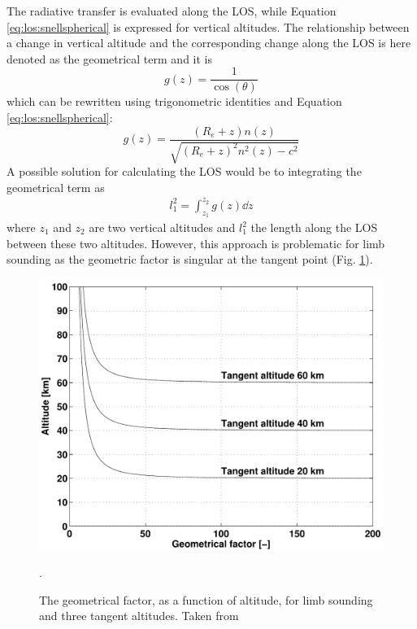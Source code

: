   The radiative transfer is evaluated along the LOS, while Equation 
  \ref{eq:los:snellspherical} is expressed for vertical altitudes.
  The relationship between a change in vertical altitude and the
  corresponding change along the LOS is here denoted as the geometrical term
  and it is \citep{eriksson:97a}
  \begin{equation}
    g(z) = \frac{1}{\cos(\theta)}
  \end{equation}
  which can be rewritten using trigonometric identities and Equation
  \ref{eq:los:snellspherical}:
  \begin{equation}
    g(z) = \frac {(R_e+z)n(z)} {\sqrt{ (R_e+z)^2n^2(z) - c^2 }}
   \label{eq:los:gterm}
  \end{equation}
  A possible solution for calculating the LOS would be to integrating the
  geometrical term as \citep{eriksson:00a}
  \begin{eqnarray}
    l_1^2 = \int_{z_1}^{z_2}{g(z)\dd z} \nonumber
  \end{eqnarray}
  where $z_1$ and $z_2$ are two vertical altitudes and $l_1^2$ the length
  along the LOS between these two altitudes. However, this approach is
  problematic for limb sounding as the geometric factor is
  singular at the tangent point (Fig. \ref{fig:los:gfac}). 
  \begin{figure}
   \begin{center}
    \includegraphics*[width=0.8\hsize]{Figs/fig_geomfac}
     \caption{The geometrical factor, as a function of altitude, for limb 
              sounding and three tangent altitudes. Taken from
              \citet{eriksson:97a}}.
    \label{fig:los:gfac}
   \end{center} 
  \end{figure}



